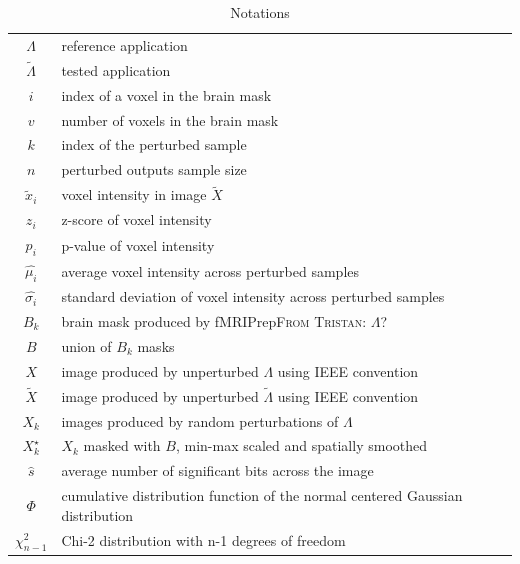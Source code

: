 \documentclass{article}
\newcommand{\TG}[1]{\color{blue}\textsc{From Tristan:} #1\color{black}\xspace}
\newcommand{\fmriprep}{fMRIPrep\xspace}
\begin{document}
\begin{table}
    \centering
    \begin{tabular}{c|l}
        $\Lambda$        & reference application \\
        $\tilde \Lambda$ & tested application\\
        $i$              & index of a voxel in the brain mask                                            \\
        $v$              & number of voxels in the brain mask                                            \\
        $k$              & index of the perturbed sample                                                 \\
        $n$              & perturbed outputs sample size                                                 \\
        $\tilde x_i$     & voxel intensity in image $\tilde X$                                                         \\
        $z_i$            & z-score of voxel intensity                                                    \\
        $p_i$            & p-value of voxel intensity                                                    \\
        $\hat{\mu_i}$    & average voxel intensity across perturbed samples                              \\
        $\hat{\sigma_i}$ & standard deviation of voxel intensity across perturbed samples                \\
        $B_k$            & brain mask produced by \fmriprep  \TG{$\Lambda$?}                             \\
        $B$              & union of $B_k$ masks                                                          \\
        $X$              & image produced by unperturbed $\Lambda$ using IEEE convention                             \\
        $\tilde X$       & image produced by unperturbed $\tilde \Lambda$ using IEEE convention                      \\
        $X_k$            & images produced by random perturbations of $\Lambda$                          \\
        $X_k^{\star}$    & $X_k$ masked with $B$, min-max scaled and spatially smoothed                  \\
        $\hat{s}$        & average number of significant bits across the image                           \\
        $\Phi$           & cumulative distribution function of the normal centered Gaussian distribution \\
        $\chi^2_{n-1}$   & Chi-2 distribution with n-1 degrees of freedom                                \\
    \end{tabular}
    \caption{Notations}
    \label{tab:notations}
\end{table}
\end{document}
